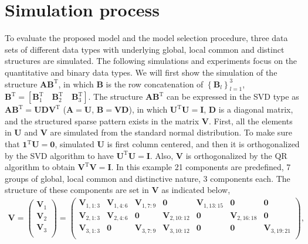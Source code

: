 \section{Simulation process} \label{section:5.4}
To evaluate the proposed model and the model selection procedure, three data sets of different data types with underlying global, local common and distinct structures are simulated. The following simulations and experiments focus on the quantitative and binary data types. We will first show the simulation of the structure $\mathbf{A}\mathbf{B}^{\text{T}}$, in which $\mathbf{B}$ is the row concatenation of $\left\{\mathbf{B}_l\right\}_{l=1}^3$, $\mathbf{B}^{\text{T}} = [\mathbf{B}_1^{\text{T}} \quad \mathbf{B}_2^{\text{T}} \quad \mathbf{B}_3^{\text{T}}]$. The structure $\mathbf{A}\mathbf{B}^{\text{T}}$ can be expressed in the SVD type as $\mathbf{A}\mathbf{B}^{\text{T}} = \mathbf{U}\mathbf{D}\mathbf{V}^{\text{T}}$ ($\mathbf{A}=\mathbf{U}$, $\mathbf{B}=\mathbf{V}\mathbf{D}$), in which $\mathbf{U}^{\text{T}}\mathbf{U} = \mathbf{I}$, $\mathbf{D}$ is a diagonal matrix, and the structured sparse pattern exists in the matrix $\mathbf{V}$. First, all the elements in $\mathbf{U}$ and $\mathbf{V}$ are simulated from the standard normal distribution. To make sure that $\mathbf{1}^{\text{T}}\mathbf{U} = \mathbf{0}$, simulated $\mathbf{U}$ is first column centered, and then it is orthogonalized by the SVD algorithm to have $\mathbf{U}^{\text{T}}\mathbf{U} = \mathbf{I}$. Also, $\mathbf{V}$ is orthogonalized by the QR algorithm to obtain $\mathbf{V}^{\text{T}}\mathbf{V} = \mathbf{I}$. In this example 21 components are predefined, 7 groups of global, local common and distinctive nature, 3 components each. The structure of these components are set in $\mathbf{V}$ as indicated below,
\begin{equation*}
\begin{aligned}
   \mathbf{V}= \left(
                 \begin{array}{c}
                   \mathbf{V}_1 \\
                   \mathbf{V}_2 \\
                   \mathbf{V}_3 \\
                 \end{array}
               \right)
               = \left(
                   \begin{array}{cccccccc}
                     \mathbf{V}_{1,1:3} & \mathbf{V}_{1,4:6} & \mathbf{V}_{1,7:9} & \mathbf{0}       & \mathbf{V}_{1,13:15} & \mathbf{0}       & \mathbf{0}      \\
                     \mathbf{V}_{2,1:3} & \mathbf{V}_{2,4:6} & \mathbf{0}       & \mathbf{V}_{2,10:12} & \mathbf{0}       & \mathbf{V}_{2,16:18} & \mathbf{0}       \\
                     \mathbf{V}_{3,1:3} & \mathbf{0}       & \mathbf{V}_{3,7:9} & \mathbf{V}_{3,10:12} & \mathbf{0}       & \mathbf{0}       & \mathbf{V}_{3,19:21} \\
                   \end{array}
                 \right),
\end{aligned}
\end{equation*}
